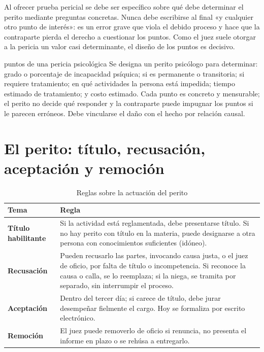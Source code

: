 \documentclass[12pt,oneside]{book}
\begin{document}
\begin{importante}
Al ofrecer prueba pericial se debe ser específico sobre qué debe determinar el perito mediante preguntas concretas. Nunca debe escribirse al final «y cualquier otro punto de interés»: es un error grave que viola el debido proceso y hace que la contraparte pierda el derecho a cuestionar los puntos. Como el juez suele otorgar a la pericia un valor casi determinante, el diseño de los puntos es decisivo.
\end{importante}

\begin{ejemplo}{puntos de una pericia psicológica}
Se designa un perito psicólogo para determinar: grado o porcentaje de incapacidad psíquica; si es permanente o transitoria; si requiere tratamiento; en qué actividades la persona está impedida; tiempo estimado de tratamiento; y costo estimado. Cada punto es concreto y mensurable; el perito no decide qué responder y la contraparte puede impugnar los puntos si le parecen erróneos. Debe vincularse el daño con el hecho por relación causal.
\end{ejemplo}

\section{El perito: título, recusación, aceptación y remoción}

\begin{table}[H]
\centering
\caption{Reglas sobre la actuación del perito}
\begin{tabularx}{\textwidth}{>{\raggedright\arraybackslash\bfseries}p{} X}
\toprule
Tema & Regla \\
\midrule
Título habilitante & Si la actividad está reglamentada, debe presentarse título. Si no hay perito con título en la materia, puede designarse a otra persona con conocimientos suficientes (idóneo). \\
Recusación & Pueden recusarlo las partes, invocando causa justa, o el juez de oficio, por falta de título o incompetencia. Si reconoce la causa o calla, se lo reemplaza; si la niega, se tramita por separado, sin interrumpir el proceso. \\
Aceptación & Dentro del tercer día; si carece de título, debe jurar desempeñar fielmente el cargo. Hoy se formaliza por escrito electrónico. \\
Remoción & El juez puede removerlo de oficio si renuncia, no presenta el informe en plazo o se rehúsa a entregarlo. \\
\bottomrule
\end{tabularx}
\end{table}
\end{document}

